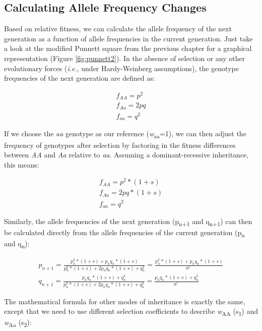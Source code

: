 \documentclass[
]{book}
\begin{document}
\hypertarget{calculating-allele-frequency-changes}{%
\subsection{Calculating Allele Frequency Changes}\label{calculating-allele-frequency-changes}}

Based on relative fitness, we can calculate the allele frequency of the next generation as a function of allele frequencies in the current generation. Just take a look at the modified Punnett square from the previous chapter for a graphical representation (Figure \ref{fig:punnett2}). In the absence of selection or any other evolutionary forces (\emph{i.e.}, under Hardy-Weinberg assumptions), the genotype frequencies of the next generation are defined as:

\begin{align} 
f_{AA}=p^2 \label{eq:9}\\
f_{Aa}=2pq \label{eq:10}\\
f_{aa}=q^2 \label{eq:11} 
\end{align}

If we choose the \emph{aa} genotype as our reference (\emph{w}\textsubscript{aa}=1), we can then adjust the frequency of genotypes after selection by factoring in the fitness differences between \emph{AA} and \emph{Aa} relative to \emph{aa}. Assuming a dominant-recessive inheritance, this means:

\begin{align} 
f_{AA}=p^2*(1+s) \label{eq:12}\\
f_{Aa}=2pq*(1+s) \label{eq:13}\\
f_{aa}=q^2 \label{eq:14} 
\end{align}

Similarly, the allele frequencies of the next generation (p\textsubscript{n+1} and q\textsubscript{n+1}) can then be calculated directly from the allele frequencies of the current generation (p\textsubscript{n} and q\textsubscript{n}):

\begin{align}
p_{n+1}=\frac{p_n^2*(1+s)+p_nq_n*(1+s)}{p_n^2*(1+s)+2p_nq_n*(1+s)+q_n^2}=\frac{p_n^2*(1+s)+p_nq_n*(1+s)}{w̄} \label{eq:15}\\
q_{n+1}=\frac{p_nq_n*(1+s)+q_n^2}{p_n^2*(1+s)+2p_nq_n*(1+s)+q_n^2}=\frac{p_nq_n*(1+s)+q_n^2}{w̄} \label{eq:16} 
\end{align}

The mathematical formula for other modes of inheritance is exactly the same, except that we need to use different selection coefficients to describe \emph{w}\textsubscript{AA} (s\textsubscript{1}) and \emph{w}\textsubscript{Aa} (s\textsubscript{2}):
\end{document}
